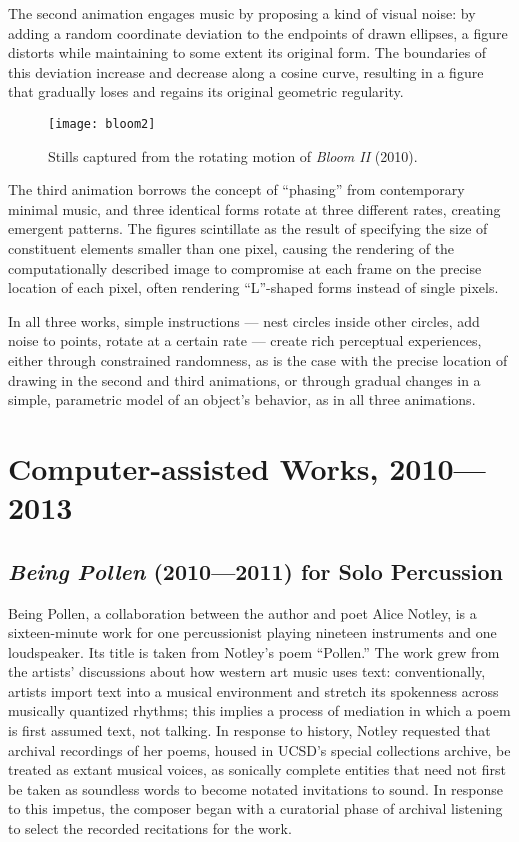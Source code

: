 The second animation engages music by proposing a kind of visual noise: by adding a random coordinate deviation to the endpoints of drawn ellipses, a figure distorts while maintaining to some extent its original form. The boundaries of this deviation increase and decrease along a cosine curve, resulting in a figure that gradually loses and regains its original geometric regularity. 

\begin{figure}[H] 
\texttt{[image: bloom2]}
\caption{Stills captured from the rotating motion of \emph{Bloom II} (2010). } 
\end{figure}

The third animation borrows the concept of ``phasing'' from contemporary minimal music, and three identical forms rotate at three different rates, creating emergent patterns. The figures scintillate as the result of specifying the size of constituent elements smaller than one pixel, causing the rendering of the computationally described image to compromise at each frame on the precise location of each pixel, often rendering ``L''-shaped forms instead of single pixels.

In all three works, simple instructions --- nest circles inside other circles, add noise to points, rotate at a certain rate --- create rich perceptual experiences, either through constrained randomness, as is the case with the precise location of drawing in the second and third animations, or through gradual changes in a simple, parametric model of an object's behavior, as in all three animations.

\section{Computer-assisted Works, 2010---2013}
\subsection{\emph{Being Pollen} (2010---2011) for Solo Percussion}
Being Pollen, a collaboration between the author and poet Alice Notley, is a sixteen-minute work for one percussionist playing nineteen instruments and one loudspeaker. Its title is taken from Notley’s poem “Pollen.” The work grew from the artists’ discussions about how western art music uses text: conventionally, artists import text into a musical environment and stretch its spokenness across musically quantized rhythms; this implies a process of mediation in which a poem is first assumed text, not talking. In response to history, Notley requested that archival recordings of her poems, housed in UCSD’s special collections archive, be treated as extant musical voices, as sonically complete entities that need not first be taken as soundless words to become notated invitations to sound. In response to this impetus, the composer began with a curatorial phase of archival listening to select the recorded recitations for the work.

